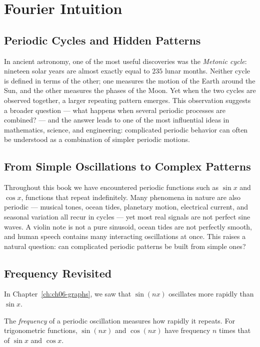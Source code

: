 \chapter{Fourier Intuition}
\label{ch:ch19-fourier-intuition}

\section{Periodic Cycles and Hidden Patterns}

In ancient astronomy, one of the most useful discoveries was the
\emph{Metonic cycle}: nineteen solar years are almost exactly equal to
$235$ lunar months. Neither cycle is defined in terms of the other; one
measures the motion of the Earth around the Sun, and the other measures
the phases of the Moon. Yet when the two cycles are observed together, a
larger repeating pattern emerges. This observation suggests a broader
question --- what happens when several periodic processes are combined?
--- and the answer leads to one of the most influential ideas in
mathematics, science, and engineering: complicated periodic behavior can
often be understood as a combination of simpler periodic motions.

\section{From Simple Oscillations to Complex Patterns}

Throughout this book we have encountered periodic functions such as
$\sin x$ and $\cos x$, functions that repeat indefinitely. Many
phenomena in nature are also periodic --- musical tones, ocean tides,
planetary motion, electrical current, and seasonal variation all recur
in cycles --- yet most real signals are not perfect sine waves. A violin
note is not a pure sinusoid, ocean tides are not perfectly smooth, and
human speech contains many interacting oscillations at once. This raises
a natural question: can complicated periodic patterns be built from
simple ones?

\section{Frequency Revisited}

In Chapter~\ref{ch:ch06-graphs}, we saw that $\sin(nx)$ oscillates more
rapidly than $\sin x$.

\begin{definition}
The \emph{frequency} of a periodic oscillation measures how rapidly it
repeats. For trigonometric functions, $\sin(nx)$ and $\cos(nx)$ have
frequency $n$ times that of $\sin x$ and $\cos x$.
\end{definition}


